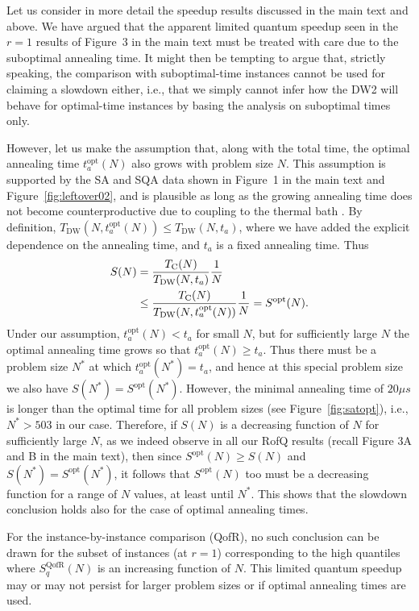 Let us consider in more detail the speedup results discussed in the main text and above. We have argued that the apparent limited quantum speedup seen in the $r=1$ results of Figure~3 in the main text must be treated with care due to the suboptimal annealing time. It might then be tempting to argue that, strictly speaking, the comparison with suboptimal-time instances cannot be used for claiming a slowdown either, i.e., that we simply cannot infer how the DW2 will behave for optimal-time instances by basing the analysis on suboptimal times only.

However, let us make the assumption that, along with the total time, the optimal annealing time $t_a^{\textrm{opt}}(N)$ also grows with problem size $N$. This assumption is supported by the SA and SQA data shown in Figure~1 in the main text and Figure~\ref{fig:leftover02}, and is plausible as long as the growing annealing time does not become counterproductive due to coupling to the thermal bath \cite{PhysRevLett.95.250503}. By definition,  $T_{\textrm{DW}}(N,t_a^{\textrm{opt}}(N)) \leq T_{\textrm{DW}}(N,t_a)$, where we have added the explicit dependence on the annealing time, and $t_a$ is a fixed annealing time. Thus
\begin{align}
S(N) &= \frac{T_{\textrm{C}}(N)}{T_{\textrm{DW}}(N,t_a)}\frac{1}{N}  \\
&\leq \frac{T_{\textrm{C}}(N)}{T_{\textrm{DW}}(N,t_a^{\textrm{opt}}(N))}\frac{1}{N} = S^{\textrm{opt}}(N) \notag.
\end{align}
Under our assumption, $t_a^{\textrm{opt}}(N) < t_a $ for small $N$, but for sufficiently large $N$ the optimal annealing time grows so that $t_a^{\textrm{opt}}(N) \geq t_a$. Thus there must be a problem size $N^*$ at which $t_a^{\textrm{opt}}(N^*) = t_a$, and hence at this special problem size we also have $S(N^*) = S^{\textrm{opt}}(N^*)$. However, the minimal annealing time of $20\mu s$ is longer than the optimal time for all problem sizes (see Figure~\ref{fig:satopt}), i.e., $N^*>503$ in our case. Therefore, if $S(N)$ is a decreasing function of $N$ for sufficiently large $N$, as we indeed observe in all our RofQ results (recall Figure 3A and B in the main text), then since $S^{\textrm{opt}}(N) \geq S(N)$ {and} $S(N^*) = S^{\textrm{opt}}(N^*)$, it follows that $S^{\textrm{opt}}(N)$ too must be a decreasing function for a range of $N$ values, at least until $N^*$. This shows that the slowdown conclusion holds also for the case of optimal annealing times.

For the instance-by-instance comparison (QofR), no such conclusion can be drawn for the subset of instances (at $r=1$) corresponding to the high quantiles where $S_q^{\textrm{QofR}}(N)$ is an {increasing} function of $N$. This limited quantum speedup may or may not persist for larger problem sizes or if optimal annealing times are used. \\

